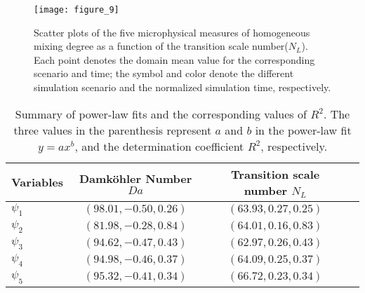 \documentclass[draft,linenumbers]{agujournal}
\begin{document}
\begin{figure}[!htbp]\centering
\texttt{[image: figure\_9]}
\caption{Scatter plots of the five microphysical measures of homogeneous mixing degree as a function of the transition scale number($N_L$). Each point denotes the domain mean value for the corresponding scenario and time; the symbol and color denote the different simulation scenario and the normalized simulation time, respectively.\label{fig:PhiNL}}
\end{figure}

\begin{table}
\centering
\caption{Summary of power-law fits and the corresponding values of $R^2$. The three values in the parenthesis represent $a$ and $b$ in the power-law fit $y = ax^b$, and the determination coefficient $R^2$, respectively.}
\label{tb:fitness}
\begin{tabular}{l c c c}
\hline
Variables & Damk\"{o}hler Number $Da$  & Transition scale number $N_L$ \\
\hline
$\psi_1$  & $(98.01, -0.50, 0.26)$  & $(63.93, 0.27, 0.25)$\\
$\psi_2$  & $(81.98, -0.28, 0.84)$  & $(64.01, 0.16, 0.83)$\\
$\psi_3$  & $(94.62, -0.47, 0.43)$  & $(62.97, 0.26, 0.43)$\\
$\psi_4$  & $(94.98, -0.46, 0.37)$  & $(64.09, 0.25, 0.37)$\\
$\psi_5$  & $(95.32, -0.41, 0.34)$  & $(66.72, 0.23, 0.34)$\\
\hline
\end{tabular}
\end{table}
\end{document}
